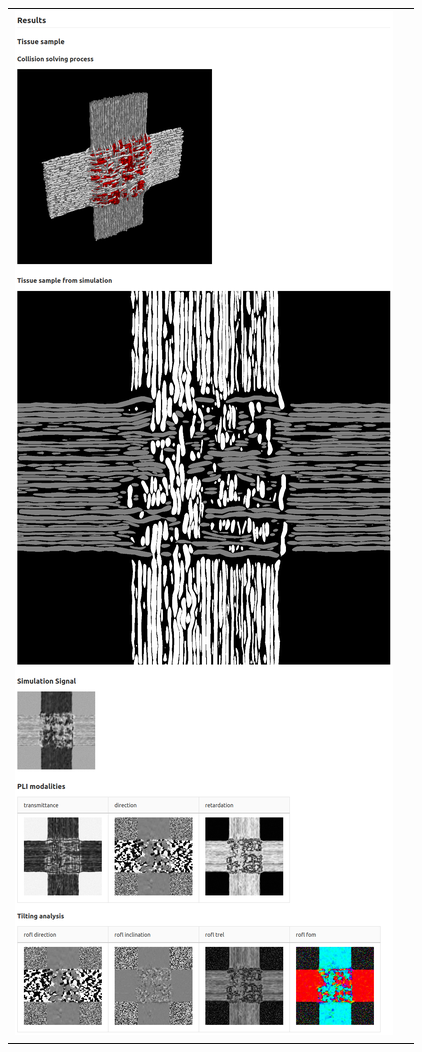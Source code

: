 \begin{figure}[!t]
{{\begin{tabular}{c|c}
 	\includegraphics[valign=T]{gfx/fastpli/fastpli_wiki_crossing_right.png} \\
    \end{tabular}
    }}
	\caption{\dummy{}}
	\label{fig:fastpli_wiki_crossing}
\end{figure}
% 
% 

